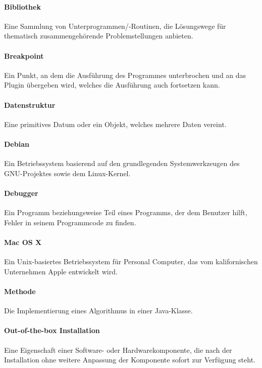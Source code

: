\documentclass[a4paper]{report}
\begin{document}
\paragraph{Bibliothek} Eine Sammlung von Unterprogrammen/-Routinen, die Lösungswege für thematisch zusammengehörende Problemstellungen anbieten.

\paragraph{Breakpoint} Ein Punkt, an dem die Ausführung des Programmes unterbrochen und an das Plugin übergeben wird, welches die Ausführung auch fortsetzen kann.

\paragraph{Datenstruktur} Eine primitives Datum oder ein Objekt, welches mehrere Daten vereint.

\paragraph{Debian}  Ein Betriebssystem basierend auf den grundlegenden Systemwerkzeugen des GNU-Projektes sowie dem Linux-Kernel.

\paragraph{Debugger} Ein Programm beziehungsweise Teil eines Programms, der dem Benutzer hilft, Fehler in seinem Programmcode zu finden.

\paragraph{Mac OS X} Ein Unix-basiertes Betriebssystem für Personal Computer, das vom kalifornischen Unternehmen Apple entwickelt wird.

\paragraph{Methode} Die Implementierung eines Algorithmus in einer Java-Klasse.

\paragraph{Out-of-the-box Installation} Eine Eigenschaft einer Software- oder Hardwarekomponente, die nach der Installation ohne weitere Anpassung der Komponente sofort zur Verfügung steht.
\end{document}
